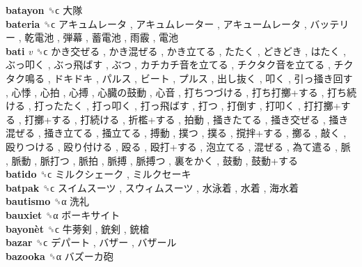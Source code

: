 \textbf{batayon} ␝ϲ   大隊   \\
\textbf{bateria} ␝ϲ   アキュムレータ ,  アキュムレーター ,  アキュームレータ ,  バッテリー ,  乾電池 ,  弾幕 ,  蓄電池 ,  雨霰 ,  電池   \\
\textbf{bati} \emph{v}  ␝ϲ   かき交ぜる ,  かき混ぜる ,  かき立てる ,  たたく ,  どきどき ,  はたく ,  ぶっ叩く ,  ぶっ飛ばす ,  ぶつ ,  カチカチ音を立てる ,  チクタク音を立てる ,  チクタク鳴る ,  ドキドキ ,  パルス ,  ビート ,  プルス ,  出し抜く ,  叩く ,  引っ掻き回す ,  心悸 ,  心拍 ,  心搏 ,  心臓の鼓動 ,  心音 ,  打ちつづける ,  打ち打擲+する ,  打ち続ける ,  打ったたく ,  打っ叩く ,  打っ飛ばす ,  打つ ,  打倒す ,  打叩く ,  打打擲+する ,  打擲+する ,  打続ける ,  折檻+する ,  拍動 ,  掻きたてる ,  掻き交ぜる ,  掻き混ぜる ,  掻き立てる ,  掻立てる ,  搏動 ,  撲つ ,  撲る ,  撹拌+する ,  擲る ,  敲く ,  殴りつける ,  殴り付ける ,  殴る ,  殴打+する ,  泡立てる ,  混ぜる ,  為て遣る ,  脈 ,  脈動 ,  脈打つ ,  脈拍 ,  脈搏 ,  脈搏つ ,  裏をかく ,  鼓動 ,  鼓動+する   \\
\textbf{batido} ␝ϲ   ミルクシェーク ,  ミルクセーキ   \\
\textbf{batpak} ␝ϲ   スイムスーツ ,  スウィムスーツ ,  水泳着 ,  水着 ,  海水着   \\
\textbf{bautismo} ␝α   洗礼   \\
\textbf{bauxiet} ␝α   ボーキサイト   \\
\textbf{bayonèt} ␝ϲ   牛蒡剣 ,  銃剣 ,  銃槍   \\
\textbf{bazar} ␝ϲ   デパート ,  バザー ,  バザール   \\
\textbf{bazooka} ␝α   バズーカ砲   \\
